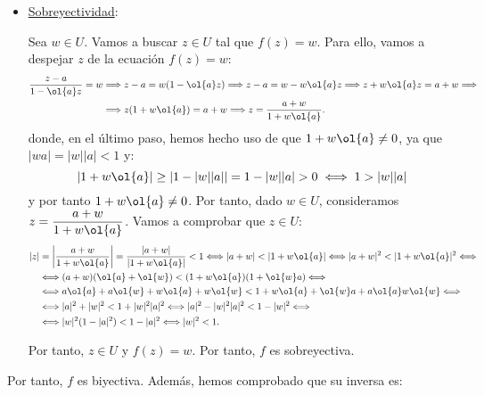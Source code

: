 \begin{ejercicio}
\begin{itemize}
        \item \ul{Sobreyectividad}:
        
        Sea $w \in U$. Vamos a buscar $z \in U$ tal que $f(z) = w$. Para ello, vamos a despejar $z$ de la ecuación $f(z) = w$:
        \begin{align*}
            \dfrac{z-a}{1-\ol{a}z} = w &\Longrightarrow
            z-a = w(1-\ol{a}z) \Longrightarrow
            z-a = w - w\ol{a}z \Longrightarrow
            z + w\ol{a}z = a + w \Longrightarrow\\&\Longrightarrow
            z(1+w\ol{a}) = a + w \Longrightarrow
            z = \dfrac{a+w}{1+w\ol{a}}.
        \end{align*}
        donde, en el último paso, hemos hecho uso de que $1+w\ol{a}\neq 0$, ya que $|wa|=|w||a|<1$ y:
        \begin{equation*}
            |1+w\ol{a}| \geq
            \left|1-|w||a|\right|=1-|w||a|>0
            \iff 1>|w||a|
        \end{equation*}
        y por tanto $1+w\ol{a}\neq 0$. Por tanto, dado $w \in U$, consideramos $z = \dfrac{a+w}{1+w\ol{a}}$. Vamos a comprobar que $z \in U$:
        \begin{align*}
            |z| &= \left|\dfrac{a+w}{1+w\ol{a}}\right| = \dfrac{|a+w|}{|1+w\ol{a}|} < 1 \Longleftrightarrow
            |a+w| < |1+w\ol{a}| \Longleftrightarrow
            |a+w|^2 < |1+w\ol{a}|^2 \Longleftrightarrow \\&\Longleftrightarrow
            (a+w)(\ol{a}+\ol{w}) < (1+w\ol{a})(1+\ol{w}a) \Longleftrightarrow \\&\Longleftrightarrow
            a\ol{a} + a\ol{w} + w\ol{a} + w\ol{w} < 1 + w\ol{a} + \ol{w}a + a\ol{a}w\ol{w} \Longleftrightarrow \\&\Longleftrightarrow
            |a|^2 + |w|^2 < 1 + |w|^2|a|^2 \Longleftrightarrow
            |a|^2 - |w|^2|a|^2 < 1 - |w|^2 \Longleftrightarrow \\&\Longleftrightarrow
            |w|^2(1-|a|^2) < 1 - |a|^2 \Longleftrightarrow
            |w|^2 < 1.
        \end{align*}

        Por tanto, $z \in U$ y $f(z) = w$. Por tanto, $f$ es sobreyectiva.
    \end{itemize}

    Por tanto, $f$ es biyectiva. Además, hemos comprobado que su inversa es:
\end{ejercicio}

